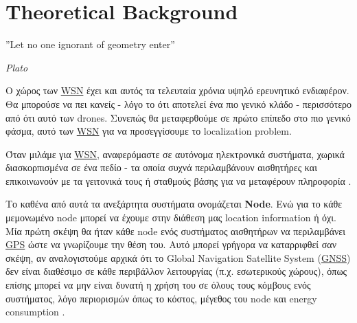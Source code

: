 \chapter{Theoretical Background} %
\label{chap:Chapter2} %
\epigraph{''Let no one ignorant of geometry enter” }{\textit{Plato}}

O χώρος των \hyperref[abbr:WSN]{WSN} έχει και αυτός τα τελευταία χρόνια υψηλό ερευνητικό ενδιαφέρον.
Θα μπορούσε να πει κανείς - λόγο το ότι αποτελεί ένα πιο γενικό κλάδο - περισσότερο από ότι αυτό των 
drones. Συνεπώς θα μεταφερθούμε σε πρώτο επίπεδο στο πιο γενικό φάσμα, αυτό των \hyperref[abbr:WSN]{WSN} 
για να προσεγγίσουμε το localization problem. 

Όταν μιλάμε για \hyperref[abbr:WSN]{WSN}, αναφερόμαστε σε αυτόνομα ηλεκτρονικά συστήματα, χωρικά διασκορπισμένα σε ένα πεδίο - τα οποία συχνά περιλαμβάνουν
αισθητήρες και επικοινωνούν με τα γειτονικά τους ή σταθμούς βάσης για να μεταφέρουν πληροφορία \cite{wsn-wikipedia} \cite{farooqiazam2016location}.

Το καθένα από αυτά τα ανεξάρτητα συστήματα ονομάζεται \textbf{Node}. Ενώ για το κάθε μεμονωμένο node 
μπορεί να έχουμε στην διάθεση μας location information ή όχι. 
Μία πρώτη σκέψη θα ήταν κάθε node ενός συστήματος αισθητήρων να περιλαμβάνει \hyperref[abbr:GPS]{GPS} ώστε να γνωρίζουμε 
την θέση του. Αυτό μπορεί γρήγορα να καταρριφθεί σαν σκέψη, αν αναλογιστούμε αρχικά ότι το Global Navigation Satellite System (\hyperref[abbr:GNSS]{GNSS})
δεν είναι διαθέσιμο σε κάθε περιβάλλον λειτουργίας (π.χ. εσωτερικούς χώρους), όπως επίσης μπορεί να μην είναι δυνατή η χρήση του σε όλους τους κόμβους
ενός συστήματος, λόγο περιορισμών όπως το κόστος, μέγεθος του node και energy consumption \cite{farooqiazam2016location}.   

\begin{table}[H]
    \caption{Nodes' names definitions}
    \label{tab:nodes-names-definition}
	\centering
\end{table}


